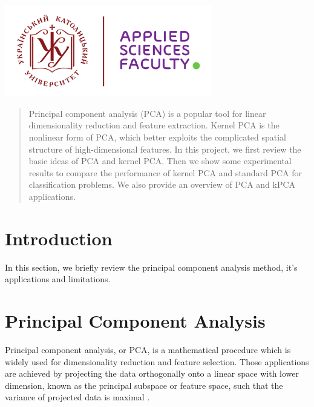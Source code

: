 \begin{titlepage}

\includegraphics[height=4cm]{img/UCU-Apps.png}\\[1cm] %
 

\vfill %

\end{titlepage}


\begin{abstract}
Principal component analysis (PCA) is a
popular tool for linear dimensionality reduction
and feature extraction. Kernel PCA
is the nonlinear form of PCA, which better
exploits the complicated spatial structure of
high-dimensional features. In this project, we
first review the basic ideas of PCA and kernel
PCA. Then we show some experimental
results to compare the performance
of kernel PCA and standard PCA for classification
problems. We also provide an overview of PCA and kPCA applications.
\end{abstract}

\section{Introduction}
In this section, we briefly review the principal component
analysis method, it's applications and limitations.

\section{Principal Component Analysis}
Principal component analysis, or PCA, is a mathematical procedure which is widely used for dimensionality reduction and feature selection. Those applications are achieved by projecting the data orthogonally onto a linear space with lower dimension, known as the principal subspace or feature space, such that the variance of projected data is maximal \citep*{bishop}.

